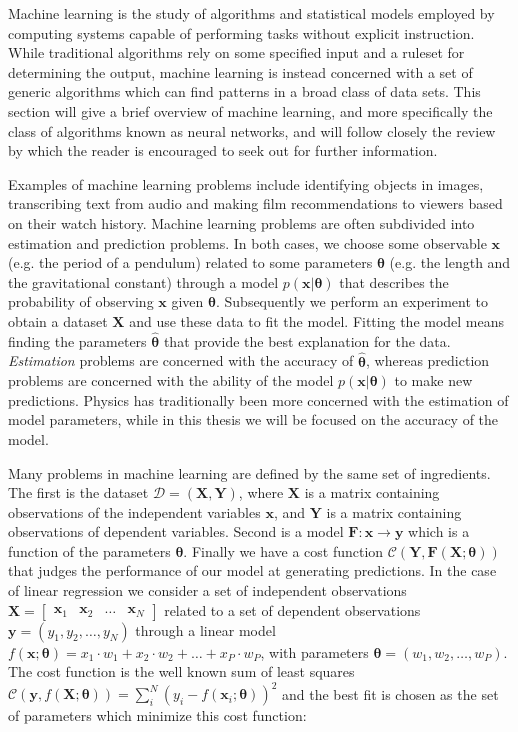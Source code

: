 Machine learning is the study of algorithms and 
statistical models employed by computing systems
capable of performing tasks without explicit instruction.
While traditional algorithms rely on some specified input 
and a ruleset for determining the output, machine learning
is instead concerned with a set of generic algorithms which can find patterns
in a broad class of data sets.
This section will give a brief overview of machine learning,
and more specifically the class of algorithms known as neural networks,
and will follow closely the review by
\parencite[Mehta et al.][pages 1-64]{mehta2019high}
which the reader is encouraged to seek out for further information.
\par
Examples of machine learning problems include identifying objects in images,
transcribing text from audio and making film recommendations to viewers 
based on their watch history.
Machine learning problems are often subdivided into 
estimation and prediction problems.
In both cases, we choose some observable 
$\bm{x}$ (e.g. the period of a pendulum)
related to some parameters $\bm{\theta}$ 
(e.g. the length and the gravitational constant)
through a model $p(\bm{x} \lvert \bm{\theta})$ 
that describes the probability of observing
$\bm{x}$ given $\bm{\theta}$. 
Subsequently we perform an experiment to obtain a dataset
$\bm{X}$ and use these data to fit the model. 
Fitting the model means finding the parameters 
$\hat{\bm{\theta}}$ that provide the best explanation for the data. 
\textit{Estimation} problems are concerned with the accuracy of 
$\hat{\bm{\theta}}$, whereas prediction problems are concerned with 
the ability of the model $p(\bm{x} \lvert \bm{\theta})$
to make new predictions.
Physics has traditionally been more concerned with the estimation 
of model parameters, while in this thesis we will be focused 
on the accuracy of the model.
\par
Many problems in machine learning are defined by the same set of ingredients.
The first is the dataset $\mathcal{D} = (\bm{X}, \bm{Y})$,
where $\bm{X}$ is a matrix containing observations of the 
independent variables $\bm{x}$, and $\bm{Y}$ is a matrix containing
observations of dependent variables.
Second is a model $\bm{F}: \bm{x} \rightarrow \bm{y}$
which is a function of the parameters $\bm{\theta}$. 
Finally we have a cost function
$\mathcal{C}\left(\bm{Y}, \bm{F}\left(\bm{X} ; \bm{\theta}\right)\right)$
that judges the performance of our model at generating predictions.
\newline
In the case of linear regression we consider a set of independent observations
$ \bm{X} = 
\begin{bmatrix}
\bm{x}_1 & \bm{x}_2 & \dots & \bm{x}_N
\end{bmatrix}
$
related to a set of dependent observations $\bm{y} = (y_1, y_2, \dots,y_N)$
through a linear model 
$f(\bm{x} ; \bm{\theta}) = 
x_1\cdot w_1 + x_2\cdot w_2 + \dots + x_P\cdot w_P$,
with parameters $\bm{\theta} = (w_1, w_2, \dots,w_P)$. 
The cost function is the well known sum of least squares 
$\mathcal{C}(\bm{y}, f(\bm{X} ; \bm{\theta}))
= \sum_i^N (y_i - f(\bm{x}_i ; \bm{\theta}))^2 $
and the best fit is chosen as the set
of parameters which minimize this cost function: 

